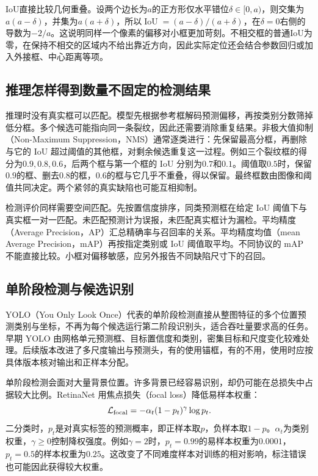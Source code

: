 IoU直接比较几何重叠。设两个边长为$a$的正方形仅水平错位$\delta\in[0,a)$，则交集为$a(a-\delta)$，并集为$a(a+\delta)$，所以$\operatorname{IoU}=(a-\delta)/(a+\delta)$，在$\delta=0$右侧的导数为$-2/a$。这说明同样一个像素的偏移对小框更加苛刻。不相交框的普通IoU为零，在保持不相交的区域内不给出靠近方向，因此实际定位还会结合参数回归或加入外接框、中心距离等项。

\subsection{推理怎样得到数量不固定的检测结果}
推理时没有真实框可以匹配。模型先根据参考框解码预测偏移，再按类别分数筛掉低分框。多个候选可能指向同一条裂纹，因此还需要消除重复结果。非极大值抑制（Non-Maximum Suppression，NMS）通常逐类进行：先保留最高分框，再删除与它的 IoU 超过阈值的其他框，对剩余候选重复这一过程。例如三个裂纹框的得分为$0.9,0.8,0.6$，后两个框与第一个框的 IoU 分别为$0.7$和$0.1$。阈值取$0.5$时，保留$0.9$的框、删去$0.8$的框，$0.6$的框与它几乎不重叠，得以保留。最终框数由图像和阈值共同决定。两个紧邻的真实缺陷也可能互相抑制。

检测评价同样需要空间匹配。先按置信度排序，同类预测框在给定 IoU 阈值下与真实框一对一匹配。未匹配预测计为误报，未匹配真实框计为漏检。平均精度（Average Precision，AP）汇总精确率与召回率的关系。平均精度均值（mean Average Precision，mAP）再按指定类别或 IoU 阈值取平均。不同协议的 mAP 不能直接比较。小框对偏移敏感，应另外报告不同缺陷尺寸下的召回。

\subsection{单阶段检测与候选识别}
YOLO（You Only Look Once）代表的单阶段检测直接从整图特征的多个位置预测类别与坐标，不再为每个候选运行第二阶段识别头，适合吞吐量要求高的任务。早期 YOLO 由网格单元预测框、目标置信度和类别，密集目标和尺度变化较难处理。后续版本改进了多尺度输出与预测头，有的使用锚框，有的不用，使用时应按具体版本核对输出和正样本分配。

单阶段检测会面对大量背景位置。许多背景已经容易识别，却仍可能在总损失中占据较大比例。RetinaNet 用焦点损失（focal loss）降低易样本权重：
\begin{equation}
 \mathcal L_{\rm focal}=-\alpha_t(1-p_t)^\gamma\log p_t.
\end{equation}
二分类时，$p_t$是对真实标签的预测概率，即正样本取$p$，负样本取$1-p$。$\alpha_t$为类别权重，$\gamma\geq0$控制降权强度。例如$\gamma=2$时，$p_t=0.99$的易样本权重为$0.0001$，$p_t=0.5$的样本权重为$0.25$。这改变了不同难度样本对训练的相对影响，标注错误也可能因此获得较大权重。

